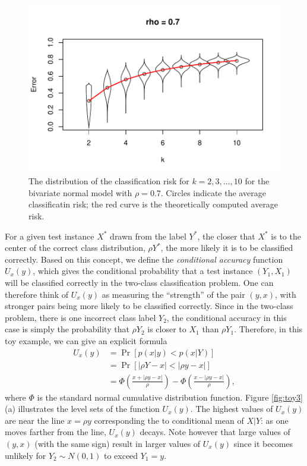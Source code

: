 \documentclass[12pt]{article}
\begin{document}
\begin{figure}[h]
\centering
\includegraphics[scale = 0.7, clip = true, trim = 0 0 0 0.5in]{illus_err_0_7.pdf}

\caption{The distribution of the classification risk for $k = 2,3,\hdots, 10$ for the bivariate normal model with $\rho = 0.7$.
Circles indicate the average classificatin risk; the red curve is the theoretically computed average risk.}\label{fig:toy2}
\end{figure}

For a given test instance $X^*$ drawn from the label $Y^*$, the closer
that $X^*$ is to the center of the correct class distribution, $\rho
Y^*$, the more likely it is to be classified correctly.  Based on this
concept, we define the \emph{conditional accuracy} function $U_x(y)$,
which gives the conditional probability that a test instance $(Y_1,
X_1)$ will be classified correctly in the two-class classification
problem.  One can therefore think of $U_x(y)$ as measuring the
``strength'' of the pair $(y, x)$, with stronger pairs being more
likely to be classified correctly.  Since in the two-class problem,
there is one incorrect class label $Y_2$, the conditional accuracy in
this case is simply the probability that $\rho Y_2$ is closer to $X_1$
than $\rho Y_1$.  Therefore, in this toy example, we can give an
explicit formula
\begin{align*}
U_x(y) &= \Pr[p(x|y) < p(x|Y)]
\\&= \Pr[|\rho Y - x|< |\rho y - x|] 
\\&= \Phi\left(\frac{x + |\rho y - x|}{\rho}\right) - \Phi\left(\frac{x - |\rho y - x|}{\rho}\right),
\end{align*}
where $\Phi$ is the standard normal cumulative distribution function.
Figure \ref{fig:toy3}(a) illustrates the level sets of the function
$U_x(y)$.  The highest values of $U_x(y)$ are near the line $x = \rho
y$ corresponding the to conditional mean of $X|Y$: as one moves
farther from the line, $U_x(y)$ decays.  Note however that large
values of $(y, x)$ (with the same sign) result in larger values of
$U_x(y)$ since it becomes unlikely for $Y_2 \sim N(0,1)$ to exceed
$Y_1 = y$.
\end{document}
